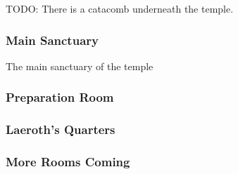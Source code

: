 \begin{multicols*}{2}
TODO: There is a catacomb underneath the temple.

\subsubsection{Main Sanctuary}
The main sanctuary of the temple

\subsubsection{Preparation Room}

\subsubsection{Laeroth's Quarters}

\subsubsection{More Rooms Coming}
\end{multicols*}


\pagebreak
